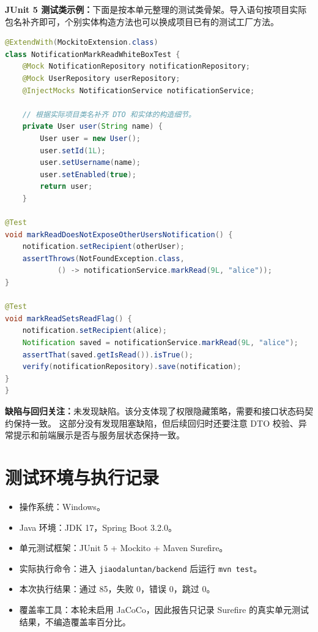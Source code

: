 \documentclass[bwprint]{report}
\begin{document}
\textbf{JUnit 5 测试类示例：}下面是按本单元整理的测试类骨架。导入语句按项目实际包名补齐即可，个别实体构造方法也可以换成项目已有的测试工厂方法。
\begin{lstlisting}[language=Java]
@ExtendWith(MockitoExtension.class)
class NotificationMarkReadWhiteBoxTest {
    @Mock NotificationRepository notificationRepository;
    @Mock UserRepository userRepository;
    @InjectMocks NotificationService notificationService;

    // 根据实际项目类名补齐 DTO 和实体的构造细节。
    private User user(String name) {
        User user = new User();
        user.setId(1L);
        user.setUsername(name);
        user.setEnabled(true);
        return user;
    }

@Test
void markReadDoesNotExposeOtherUsersNotification() {
    notification.setRecipient(otherUser);
    assertThrows(NotFoundException.class,
            () -> notificationService.markRead(9L, "alice"));
}

@Test
void markReadSetsReadFlag() {
    notification.setRecipient(alice);
    Notification saved = notificationService.markRead(9L, "alice");
    assertThat(saved.getIsRead()).isTrue();
    verify(notificationRepository).save(notification);
}
}
\end{lstlisting}

\textbf{缺陷与回归关注：}未发现缺陷。该分支体现了权限隐藏策略，需要和接口状态码契约保持一致。 这部分没有发现阻塞缺陷，但后续回归时还要注意 DTO 校验、异常提示和前端展示是否与服务层状态保持一致。


\section{测试环境与执行记录}
\begin{itemize}
\item 操作系统：Windows。
\item Java 环境：JDK 17，Spring Boot 3.2.0。
\item 单元测试框架：JUnit 5 + Mockito + Maven Surefire。
\item 实际执行命令：进入 \texttt{jiaodaluntan/backend} 后运行 \texttt{mvn test}。
\item 本次执行结果：通过 85，失败 0，错误 0，跳过 0。
\item 覆盖率工具：本轮未启用 JaCoCo，因此报告只记录 Surefire 的真实单元测试结果，不编造覆盖率百分比。
\end{itemize}
\end{document}
